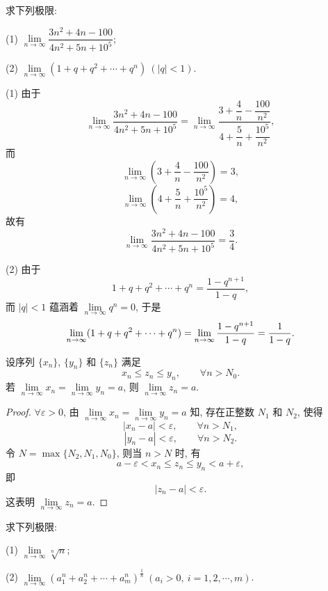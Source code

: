 \begin{example}\label{example:ma-2-2-1}
求下列极限:

(1) $\lim\limits_{n\to\infty}\dfrac{3n^2+4n-100}{4n^2+5n+10^5}$;

(2) $\lim\limits_{n\to\infty}(1+q+q^2+\cdots+q^n)\ (|q|<1)$.
\end{example}


\begin{solve}
(1) 由于
\[
  \lim_{n\to\infty}\frac{3n^2+4n-100}{4n^2+5n+10^5}
  =
  \lim_{n\to\infty}
  \frac{3+\dfrac4n-\dfrac{100}{n^2}}
       {4+\dfrac5n+\dfrac{10^5}{n^2}},
\]
而
\[
  \lim_{n\to\infty}\left(3+\frac4n-\frac{100}{n^2}\right)=3,
\]
\[
  \lim_{n\to\infty}\left(4+\frac5n+\frac{10^5}{n^2}\right)=4,
\]
故有
\[
  \lim_{n\to\infty}\frac{3n^2+4n-100}{4n^2+5n+10^5}=\frac34.
\]

(2) 由于
\[
  1+q+q^2+\cdots+q^n=\frac{1-q^{n+1}}{1-q},
\]
而 $|q|<1$ 蕴涵着 $\lim\limits_{n\to\infty}q^n=0$, 于是
\[
  \lim_{n\to\infty}(1+q+q^2+\cdots+q^n)
  =
  \lim_{n\to\infty}\frac{1-q^{n+1}}{1-q}
  =
  \frac1{1-q}.
\qedhere
\]
\end{solve}


\begin{theorem}[{夹逼收敛原理}]\label{theorem:ma-2-2-4}
设序列 $\{x_n\}$, $\{y_n\}$ 和 $\{z_n\}$ 满足
\[
  x_n\leqslant z_n\leqslant y_n,\qquad \forall n>N_0.
\]
若 $\lim\limits_{n\to\infty}x_n=\lim\limits_{n\to\infty}y_n=a$, 则 $\lim\limits_{n\to\infty}z_n=a$.
\end{theorem}


\begin{proof}
$\forall\varepsilon>0$, 由 $\lim\limits_{n\to\infty}x_n=\lim\limits_{n\to\infty}y_n=a$ 知, 存在正整数 $N_1$ 和 $N_2$, 使得
\[
  |x_n-a|<\varepsilon,\qquad \forall n>N_1,
\]
\[
  |y_n-a|<\varepsilon,\qquad \forall n>N_2.
\]
令 $N=\max\{N_2,N_1,N_0\}$, 则当 $n>N$ 时, 有
\[
  a-\varepsilon<x_n\leqslant z_n\leqslant y_n<a+\varepsilon,
\]
即
\[
  |z_n-a|<\varepsilon.
\]
这表明 $\lim\limits_{n\to\infty}z_n=a$.
\end{proof}


\begin{example}\label{example:ma-2-2-2}
求下列极限:

(1) $\lim\limits_{n\to\infty}\sqrt[n]{n}$;

(2) $\lim\limits_{n\to\infty}(a_1^n+a_2^n+\cdots+a_m^n)^{\frac1n}\ (a_i>0,\ i=1,2,\cdots,m)$.
\end{example}


